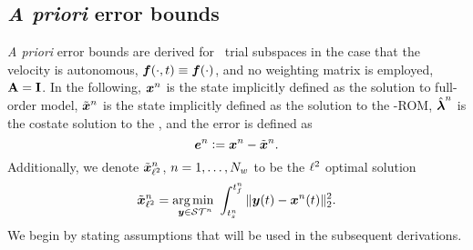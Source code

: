\subsection{\textit{A priori} error bounds}
\textit{A priori} error bounds are derived for \spatialAcronym\ trial subspaces in the case that the velocity is autonomous, $\boldsymbol f(\cdot,t) \equiv \boldsymbol f(\cdot)$, and no weighting matrix is employed, $\mathbf{A} = \mathbf{I}$.
In the following,  ${\boldsymbol x}^{n}$ is the state implicitly defined as the solution to full-order model, $\tilde{\boldsymbol x}^{n}$ is the state implicitly defined as the solution to the \methodAcronym-ROM, $\hat{\boldsymbol \lambda}^{n}$ is the costate solution to the \methodAcronymROM, and the error is defined as
$$\boldsymbol e^{n} \vcentcolon= {\boldsymbol x}^{n} - \tilde{\boldsymbol x}^{n}.$$
Additionally, we denote $\tilde{\boldsymbol x}_{\ell^2}^{n}$, $n=1,\ldots,N_w$ to be the $\ell^2$ optimal solution
$$\tilde{\boldsymbol x}_{\ell^2}^{n} = \underset{\boldsymbol y \in
\mathcal{ ST }^n}{\text{arg}\,\text{min } } \int_{t_s^{n}}^{t_f^{n}} \|  \boldsymbol y(t) - {\boldsymbol x}^{n}(t)  \|_2^2.$$ 
We begin by stating assumptions that will be used in the subsequent derivations.

